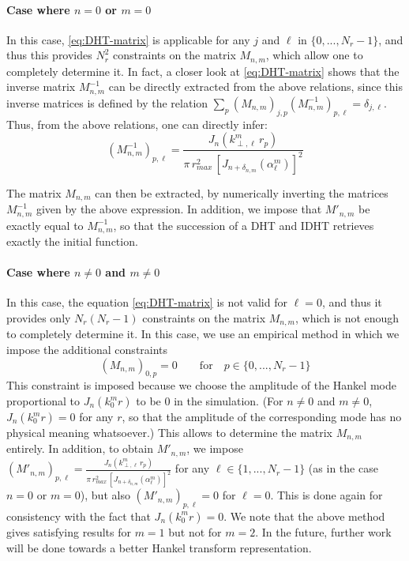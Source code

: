 \paragraph{Case where $n=0$ or $m=0$} In this case,
\cref{eq:DHT-matrix} is applicable for any $j$ and $\ell$ in  $\{ 0,
..., N_r-1 \}$, and thus this provides $N_r^2$ constraints on the matrix
$M_{n,m}$, which allow one to completely determine it. 
In fact, a closer look at \cref{eq:DHT-matrix} shows
that the inverse matrix $M^{-1}_{n,m}$ can be directly extracted from the above relations,
since this inverse matrices is defined by the relation $\sum_p (M_{n,m})_{j,p}
(M^{-1}_{n,m})_{p,\ell} = \delta_{j,\ell}$. Thus, from the above
relations, one can directly infer:
\begin{equation} (M_{n,m}^{-1})_{p,\ell} = \frac{ J_n(k^m_{\perp,\ell}\,r_p) } { \pi\,
  r_{max}^2\,[ J_{n+\delta_{n,m}}(\alpha_\ell^m)]^2  } \end{equation}

\noindent The matrix $M_{n,m}$ can then be extracted, by numerically inverting
the matrices  $M^{-1}_{n,m}$ given by the above expression. In
addition, we impose that $M'_{n,m}$ be exactly equal to
$M^{-1}_{n,m}$, so that the succession of a DHT and IDHT retrieves
exactly the initial function.

\paragraph{Case where $n \neq 0$ and $m \neq 0$} In this case, the
equation \cref{eq:DHT-matrix} is not valid for $\ell=0$, and thus it
provides only $N_r(N_r-1)$ constraints on the matrix $M_{n,m}$, which
is not enough to completely determine it. In this case, we use an
empirical method in which we impose the additional constraints
\begin{equation} (M_{n,m})_{0,p} = 0 \qquad \mathrm{for} \quad p \in \{ 0, ...,
N_r-1 \} \end{equation}
\noindent This constraint is imposed because we choose the amplitude of the
Hankel mode proportional to $J_{n}(k^m_0 r)$ to be 0 in the
simulation. (For $n\neq 0$ and $m \neq 0$, $J_n(k^m_0 r)=0$ for any
$r$, so that the amplitude of the corresponding mode has no physical
meaning whatsoever.) This allows to determine the matrix
$M_{n,m}$ entirely. In addition, to obtain $M'_{n,m}$, we impose
$ (M'_{n,m})_{p,\ell}=\frac{ J_n(k^m_{\perp,\ell}\,r_p) } { \pi\,
  r_{max}^2\,[ J_{n+\delta_{n,m}}(\alpha_\ell^m)]^2  }$ for any $\ell \in \{1,
..., N_r-1 \}$ (as in the case $n=0$ or $m=0$), but also $(M'_{n,m})_{p,\ell}=0$ for
$\ell=0$. This is done again for consistency with the fact that
$J_n(k^m_0 r)=0$. We note that the
above method gives satisfying results for $m=1$ but not for $m=2$. 
In the future, further work will be done towards a better Hankel transform representation.


